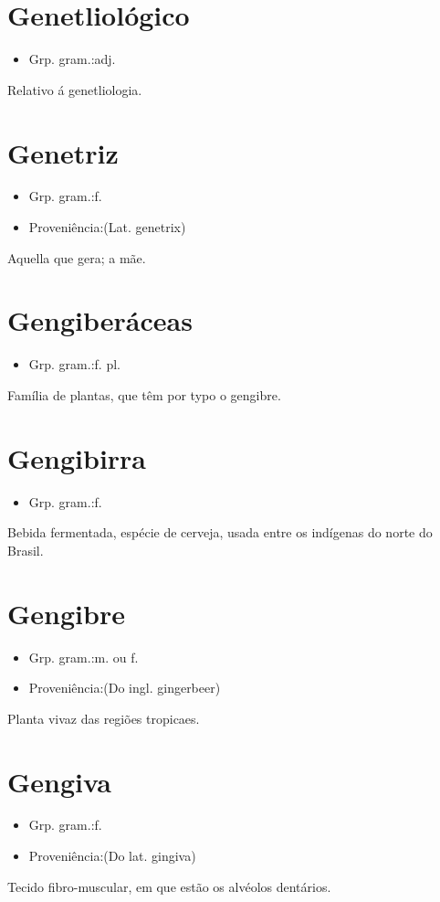 \section{Genetliológico}
\begin{itemize}
\item {Grp. gram.:adj.}
\end{itemize}
Relativo á genetliologia.
\section{Genetriz}
\begin{itemize}
\item {Grp. gram.:f.}
\end{itemize}
\begin{itemize}
\item {Proveniência:(Lat. \textunderscore genetrix\textunderscore )}
\end{itemize}
Aquella que gera; a mãe.
\section{Gengiberáceas}
\begin{itemize}
\item {Grp. gram.:f. pl.}
\end{itemize}
Família de plantas, que têm por typo o gengibre.
\section{Gengibirra}
\begin{itemize}
\item {Grp. gram.:f.}
\end{itemize}
Bebida fermentada, espécie de cerveja, usada entre os indígenas do norte do Brasil.
\section{Gengibre}
\begin{itemize}
\item {Grp. gram.:m.  ou  f.}
\end{itemize}
\begin{itemize}
\item {Proveniência:(Do ingl. \textunderscore gingerbeer\textunderscore )}
\end{itemize}
Planta vivaz das regiões tropicaes.
\section{Gengiva}
\begin{itemize}
\item {Grp. gram.:f.}
\end{itemize}
\begin{itemize}
\item {Proveniência:(Do lat. \textunderscore gingiva\textunderscore )}
\end{itemize}
Tecido fibro-muscular, em que estão os alvéolos dentários.
